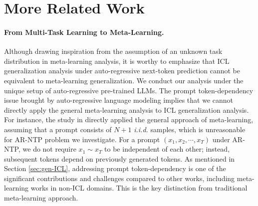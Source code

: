 \section{More Related Work}\label{app:related-work}
\paragraph{From Multi-Task Learning to Meta-Learning.} Although drawing inspiration from the assumption of an unknown task distribution in meta-learning analysis, it is worthy to emphasize that ICL generalization analysis under auto-regressive next-token prediction cannot be equivalent to meta-learning generalization. We conduct our analysis under the unique setup of auto-regressive pre-trained LLMs. The prompt token-dependency issue brought by auto-regressive language modeling implies that we cannot directly apply the general meta-learning analysis to ICL generalization analysis. For instance, the study in \cite{bai2024transformers} directly applied the general approach of meta-learning, assuming that a prompt consists of $N+1$ \emph{i.i.d.} samples, which is unreasonable for AR-NTP problem we investigate. For a prompt $(x_1, x_2, \cdots, x_T)$ under AR-NTP, we do not require $x_1 \sim x_T$ to be independent of each other; instead, subsequent tokens depend on previously generated tokens. As mentioned in Section \ref{sec:gen-ICL}, addressing prompt token-dependency is one of the significant contributions and challenges compared to other works, including meta-learning works in non-ICL domains. This is the key distinction from traditional meta-learning approach.

